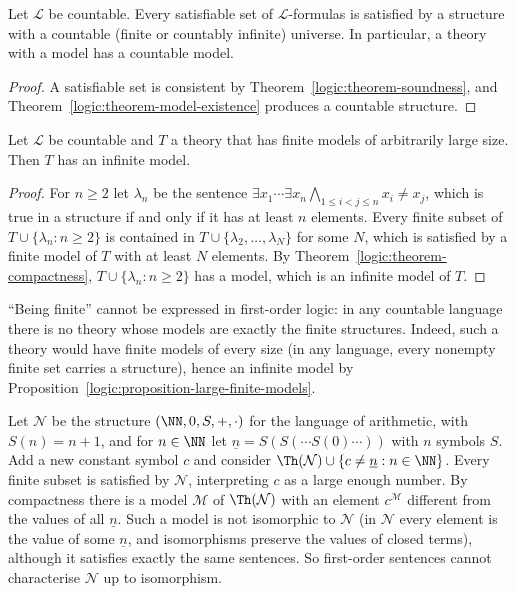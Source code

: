 \begin{theorem}\label{logic:theorem-lowenheim-skolem}
Let $\mathcal{L}$ be countable. Every satisfiable set of $\mathcal{L}$-formulas
is satisfied by a structure with a countable (finite or countably infinite)
universe. In particular, a theory with a model has a countable model.
\end{theorem}

\begin{proof}
A satisfiable set is consistent by Theorem~\ref{logic:theorem-soundness}, and
Theorem~\ref{logic:theorem-model-existence} produces a countable structure.
\end{proof}

\begin{proposition}\label{logic:proposition-large-finite-models}
Let $\mathcal{L}$ be countable and $T$ a theory that has finite models of
arbitrarily large size. Then $T$ has an infinite model.
\end{proposition}

\begin{proof}
For $n \geq 2$ let $\lambda_n$ be the sentence
$\exists x_1 \cdots \exists x_n \bigwedge_{1 \leq i < j \leq n} x_i \neq x_j$, which
is true in a structure if and only if it has at least $n$ elements. Every
finite subset of $T \cup \{\lambda_n : n \geq 2\}$ is contained in
$T \cup \{\lambda_2, \ldots, \lambda_N\}$ for some $N$, which is satisfied by a
finite model of $T$ with at least $N$ elements. By
Theorem~\ref{logic:theorem-compactness}, $T \cup \{\lambda_n : n \geq 2\}$ has a
model, which is an infinite model of $T$.
\end{proof}

\begin{counterexample}\label{logic:counterexample-finiteness}
``Being finite'' cannot be expressed in first-order logic: in any countable
language there is no theory whose models are exactly the finite structures.
Indeed, such a theory would have finite models of every size (in any
language, every nonempty finite set carries a structure), hence an infinite
model by Proposition~\ref{logic:proposition-large-finite-models}.
\end{counterexample}

\begin{example}\label{logic:example-nonstandard-arithmetic}
Let $\mathcal{N}$ be the structure $(\NN, 0, S, +, \cdot)$ for the language of
arithmetic, with $S(n) = n + 1$, and for $n \in \NN$ let
$\underline{n} = S(S(\cdots S(0)\cdots))$ with $n$ symbols $S$. Add a new constant
symbol $c$ and consider
$\Th(\mathcal{N}) \cup \{c \neq \underline{n} : n \in \NN\}$. Every finite subset
is satisfied by $\mathcal{N}$, interpreting $c$ as a large enough number. By
compactness there is a model $\mathcal{M}$ of $\Th(\mathcal{N})$ with an
element $c^{\mathcal{M}}$ different from the values of all
$\underline{n}$. Such a model is not isomorphic to $\mathcal{N}$ (in
$\mathcal{N}$ every element is the value of some $\underline{n}$, and
isomorphisms preserve the values of closed terms), although it satisfies
exactly the same sentences. So first-order sentences cannot characterise
$\mathcal{N}$ up to isomorphism.
\end{example}

